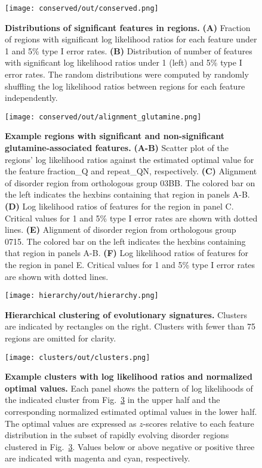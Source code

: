 \begin{figure}[h!]
\texttt{[image: conserved/out/conserved.png]}
\centering
\caption{\textbf{Distributions of significant features in regions.}
\textbf{(A)} Fraction of regions with significant log likelihood ratios for each feature under 1 and 5\% type I error rates.
\textbf{(B)} Distribution of number of features with significant log likelihood ratios under 1 (left) and 5\% type I error rates. The random distributions were computed by randomly shuffling the log likelihood ratios between regions for each feature independently.}
\label{fig:conserved}
\end{figure}

\begin{figure}[h!]
\texttt{[image: conserved/out/alignment\_glutamine.png]}
\centering
\caption{\textbf{Example regions with significant and non-significant glutamine-associated features.}
\textbf{(A-B)} Scatter plot of the regions' log likelihood ratios against the estimated optimal value for the feature fraction\_Q and repeat\_QN, respectively.
\textbf{(C)} Alignment of disorder region from orthologous group 03BB. The colored bar on the left indicates the hexbins containing that region in panels A-B.
\textbf{(D)} Log likelihood ratios of features for the region in panel C. Critical values for 1 and 5\% type I error rates are shown with dotted lines.
\textbf{(E)} Alignment of disorder region from orthologous group 0715. The colored bar on the left indicates the hexbins containing that region in panels A-B.
\textbf{(F)} Log likelihood ratios of features for the region in panel E. Critical values for 1 and 5\% type I error rates are shown with dotted lines.}
\label{fig:alignment}
\end{figure}

\begin{figure}[h!]
\texttt{[image: hierarchy/out/hierarchy.png]}
\centering
\caption{\textbf{Hierarchical clustering of evolutionary signatures.}
Clusters are indicated by rectangles on the right. Clusters with fewer than 75 regions are omitted for clarity.}
\label{fig:hierarchy}
\end{figure}

\begin{figure}[h!]
\texttt{[image: clusters/out/clusters.png]}
\centering
\caption{\textbf{Example clusters with log likelihood ratios and normalized optimal values.}
Each panel shows the pattern of log likelihoods of the indicated cluster from Fig.~\ref{fig:hierarchy} in the upper half and the corresponding normalized estimated optimal values in the lower half. The optimal values are expressed as $z$-scores relative to each feature distribution in the subset of rapidly evolving disorder regions clustered in Fig.~\ref{fig:hierarchy}. Values below or above negative or positive three are indicated with magenta and cyan, respectively.}
\label{fig:clusters}
\end{figure}

